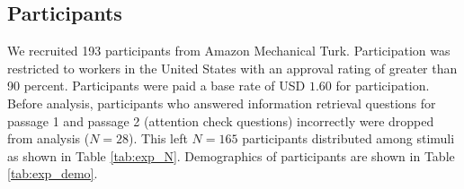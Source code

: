 \subsection{Participants} 

We recruited 193 participants from Amazon Mechanical Turk. Participation was restricted to
workers in the United States with an approval rating of greater than 90 percent. Participants were paid a base rate of USD $1.60$ for participation. Before analysis, participants who answered information retrieval questions for passage 1 and passage 2 (attention check questions) incorrectly were dropped from analysis ($N = 28$).  This left $N = 165$ participants distributed among stimuli as shown in Table \ref{tab:exp_N}. Demographics of participants are shown in Table \ref{tab:exp_demo}.


\begin{table}[h!]
\caption{Participant demographics.}
\label{tab:exp_demo}
\end{table}

